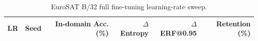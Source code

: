 \begin{table}[t]
\centering
\caption{EuroSAT B/32 full fine-tuning learning-rate sweep.}
\label{tab:lr-sweep}
\small
\begin{tabular}{lrrrrr}
\toprule
LR & Seed & In-domain Acc. (\%) & $\Delta$Entropy & $\Delta$ERF@0.95 & Retention (\%) \\
\midrule

\bottomrule
\end{tabular}
\end{table}
